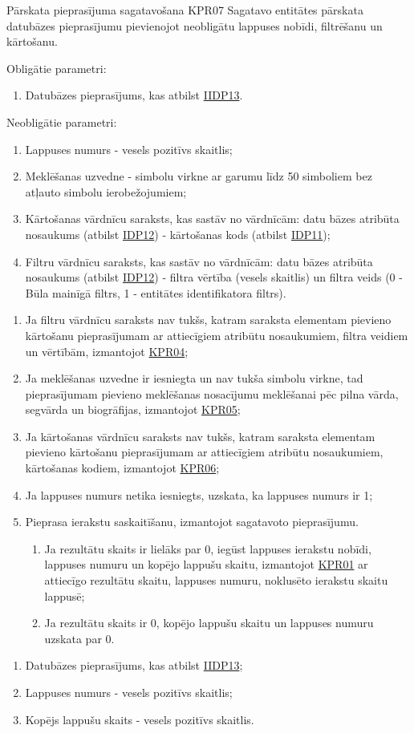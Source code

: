 \procedureTable
{
	Pārskata pieprasījuma sagatavošana
}
{KPR07}
{
	Sagatavo entitātes pārskata datubāzes pieprasījumu pievienojot neobligātu lappuses nobīdi, filtrēšanu un kārtošanu.
}
{
	Obligātie parametri:
	\begin{enumerate}
		\item Datubāzes pieprasījums, kas atbilst \hyperref[tab:IIDP13]{IIDP13}.
	\end{enumerate}

	Neobligātie parametri:
	\begin{enumerate}
		\item Lappuses numurs - vesels pozitīvs skaitlis;
		\item Meklēšanas uzvedne - simbolu virkne ar garumu līdz 50 simboliem bez atļauto simbolu ierobežojumiem;
		\item Kārtošanas vārdnīcu saraksts, kas sastāv no vārdnīcām: datu bāzes atribūta nosaukums (atbilst \hyperref[tab:IDP12]{IDP12}) - kārtošanas kods (atbilst \hyperref[tab:IDP11]{IDP11});
		\item Filtru vārdnīcu saraksts, kas sastāv no vārdnīcām: datu bāzes atribūta nosaukums (atbilst \hyperref[tab:IDP12]{IDP12}) - filtra vērtība (vesels skaitlis) un filtra veids (0 - Būla mainīgā filtrs, 1 - entitātes identifikatora filtrs).
	\end{enumerate}
}
{
	\begin{enumerate}
		\item Ja filtru vārdnīcu saraksts nav tukšs, katram saraksta elementam pievieno kārtošanu pieprasījumam ar attiecīgiem atribūtu nosaukumiem, filtra veidiem un vērtībām, izmantojot \hyperref[tab:KPR04]{KPR04};
		\item Ja meklēšanas uzvedne ir iesniegta un nav tukša simbolu virkne, tad pieprasījumam pievieno meklēšanas nosacījumu meklēšanai pēc pilna vārda, segvārda un biogrāfijas, izmantojot \hyperref[tab:KPR05]{KPR05};
		\item Ja kārtošanas vārdnīcu saraksts nav tukšs, katram saraksta elementam pievieno kārtošanu pieprasījumam ar attiecīgiem atribūtu nosaukumiem, kārtošanas kodiem, izmantojot \hyperref[tab:KPR06]{KPR06};
		\item Ja lappuses numurs netika iesniegts, uzskata, ka lappuses numurs ir 1;
		\item Pieprasa ierakstu saskaitīšanu, izmantojot sagatavoto pieprasījumu.
		      \begin{enumerate}
			      \item Ja rezultātu skaits ir lielāks par 0, iegūst lappuses ierakstu nobīdi, lappuses numuru un kopējo lappušu skaitu, izmantojot \hyperref[tab:KPR01]{KPR01} ar attiecīgo rezultātu skaitu, lappuses numuru, noklusēto ierakstu skaitu lappusē;
			      \item Ja rezultātu skaits ir 0, kopējo lappušu skaitu un lappuses numuru uzskata par 0.
		      \end{enumerate}
	\end{enumerate}
}
{
	\begin{enumerate}
		\item Datubāzes pieprasījums, kas atbilst \hyperref[tab:IIDP13]{IIDP13};
		\item Lappuses numurs - vesels pozitīvs skaitlis;
		\item Kopējs lappušu skaits - vesels pozitīvs skaitlis.
	\end{enumerate}
}
